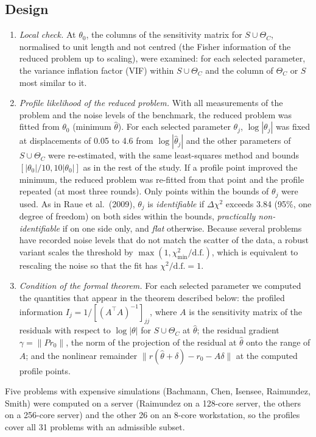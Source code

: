 \subsection*{Design}
\begin{enumerate}\itemsep0pt
\item \emph{Local check.} At $\theta_0$, the columns of the sensitivity matrix for $S\cup\Theta_C$, normalised to unit length and not centred (the Fisher information of the reduced problem up to scaling), were examined: for each selected parameter, the variance inflation factor (VIF) within $S\cup\Theta_C$ and the column of $\Theta_C$ or $S$ most similar to it.
\item \emph{Profile likelihood of the reduced problem.} With all measurements of the problem and the noise levels of the benchmark, the reduced problem was fitted from $\theta_0$ (minimum $\hat\theta$). For each selected parameter $\theta_j$, $\log|\theta_j|$ was fixed at displacements of 0.05 to 4.6 from $\log|\hat\theta_j|$ and the other parameters of $S\cup\Theta_C$ were re-estimated, with the same least-squares method and bounds $[|\theta_0|/10,10|\theta_0|]$ as in the rest of the study. If a profile point improved the minimum, the reduced problem was re-fitted from that point and the profile repeated (at most three rounds). Only points within the bounds of $\theta_j$ were used. As in Raue et al.\ (2009), $\theta_j$ is \emph{identifiable} if $\Delta\chi^2$ exceeds 3.84 (95\%, one degree of freedom) on both sides within the bounds, \emph{practically non-identifiable} if on one side only, and \emph{flat} otherwise. Because several problems have recorded noise levels that do not match the scatter of the data, a robust variant scales the threshold by $\max(1,\chi^2_{\min}/\mathrm{d.f.})$, which is equivalent to rescaling the noise so that the fit has $\chi^2/\mathrm{d.f.}=1$.
\item \emph{Condition of the formal theorem.} For each selected parameter we computed the quantities that appear in the theorem described below: the profiled information $I_j=1/[(A^{\top}A)^{-1}]_{jj}$, where $A$ is the sensitivity matrix of the residuals with respect to $\log|\theta|$ for $S\cup\Theta_C$ at $\hat\theta$; the residual gradient $\gamma=\|P r_0\|$, the norm of the projection of the residual at $\hat\theta$ onto the range of $A$; and the nonlinear remainder $\|r(\hat\theta+\delta)-r_0-A\delta\|$ at the computed profile points.
\end{enumerate}
Five problems with expensive simulations (Bachmann, Chen, Isensee, Raimundez, Smith) were computed on a server (Raimundez on a 128-core server, the others on a 256-core server) and the other 26 on an 8-core workstation, so the profiles cover all 31 problems with an admissible subset.

